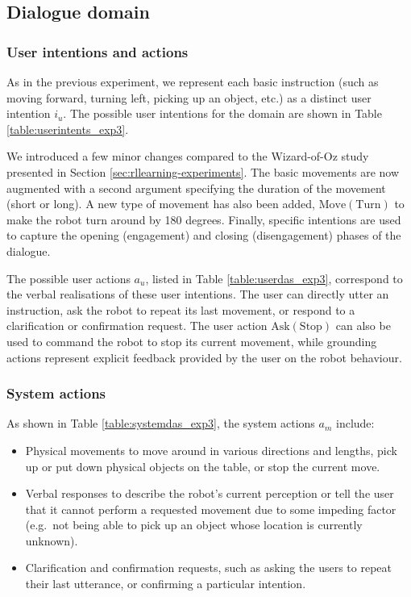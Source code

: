 \subsection{Dialogue domain}
\subsubsection*{User intentions and actions}
As in the previous experiment, we represent each basic instruction (such as moving forward, turning left, picking up an object, etc.) as a distinct user intention $i_u$. The possible user intentions for the domain are shown in Table \ref{table:userintents_exp3}.  

We introduced a few minor changes compared to the Wizard-of-Oz study presented in Section \ref{sec:rllearning-experiments}. The basic movements are now augmented with a second argument specifying the duration of the movement (short or long). A new type of movement has also been added, $\mathrm{Move(Turn)}$ to make the robot turn around by 180 degrees.  Finally, specific intentions are used to capture the opening (engagement) and closing (disengagement) phases of the dialogue. 

The possible user actions $a_u$, listed in Table \ref{table:userdas_exp3}, correspond to the verbal realisations of these user intentions. The user can directly utter an instruction, ask the robot to repeat its last movement, or respond to a clarification or confirmation request.   The user action $\mathrm{Ask(Stop)}$ can also be used to command the robot to stop its current movement, while grounding actions represent explicit feedback provided by the user on the robot behaviour.

\subsubsection*{System actions}
As shown in Table \ref{table:systemdas_exp3}, the system actions $a_m$ include: \begin{itemize}
\item Physical movements to move around in various directions and lengths, pick up or put down physical objects on the table, or stop the current move.
\item Verbal responses to describe the robot's current perception or tell the user that it cannot perform a requested movement due to some impeding factor (e.g.\ not being able to pick up an object whose location is currently unknown). 
\item Clarification and confirmation requests, such as asking the users to repeat their last utterance, or confirming a particular intention.
\end{itemize}

